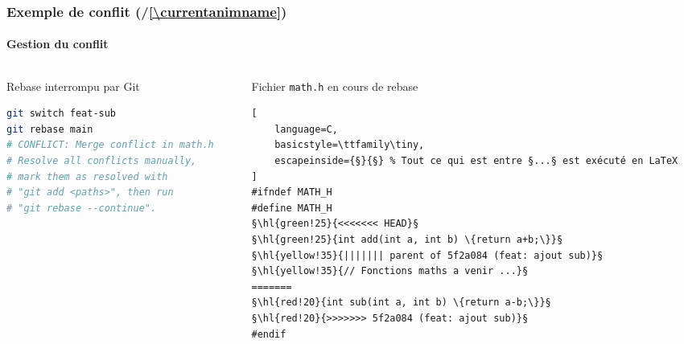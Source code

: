\documentclass[
	11pt,
	aspectratio=169
]{beamer}
\newcommand{\hl}[2]{\setlength{\fboxsep}{1.2pt}\colorbox{#1}{\ttfamily\tiny\strut #2}}
\newcounter{animstep}
\newcommand{\stepanim}{%
    \stepcounter{animstep}%
    (\theanimstep/\ref*{\currentanimname})%
}
\begin{document}
\begin{frame}[fragile]
    \frametitle{Exemple de conflit \stepanim}
    \framesubtitle{Gestion du conflit}

    \begin{center}
    \end{center}
    \vspace{-0.3cm}

    \begin{columns}[t]
        \begin{column}{0.48\textwidth}
            \begin{alertblock}{\scriptsize Rebase interrompu par Git}
\begin{lstlisting}[language=bash]
git switch feat-sub
git rebase main
# CONFLICT: Merge conflict in math.h
# Resolve all conflicts manually,
# mark them as resolved with
# "git add <paths>", then run
# "git rebase --continue".
\end{lstlisting}
            \end{alertblock}
        \end{column}
        \begin{column}{0.48\textwidth}
            \begin{alertblock}{\scriptsize Fichier \texttt{math.h} en cours de rebase}
\begin{lstlisting}[
    language=C,
    basicstyle=\ttfamily\tiny,
    escapeinside={§}{§} % Tout ce qui est entre §...§ est exécuté en LaTeX
]
#ifndef MATH_H
#define MATH_H
§\hl{green!25}{<<<<<<< HEAD}§
§\hl{green!25}{int add(int a, int b) \{return a+b;\}}§
§\hl{yellow!35}{||||||| parent of 5f2a084 (feat: ajout sub)}§
§\hl{yellow!35}{// Fonctions maths a venir ...}§
=======
§\hl{red!20}{int sub(int a, int b) \{return a-b;\}}§
§\hl{red!20}{>>>>>>> 5f2a084 (feat: ajout sub)}§
#endif
\end{lstlisting}
            \end{alertblock}
        \end{column}
    \end{columns}
\end{frame}
\end{document}
